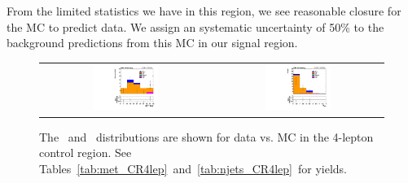 From the limited statistics we have in this region, we see reasonable closure for the MC to predict data.
We assign an systematic uncertainty of 50\% to the background predictions from this MC in our signal region.


\begin{figure}[!h]
\begin{center}
\begin{tabular}{cc}
\includegraphics[width=0.4\textwidth]{bkgd/figs/h_metall_ll_signalregion_CR4lep_passtrig.pdf} &
\includegraphics[width=0.4\textwidth]{bkgd/figs/h_njtall_ll_signalregion_CR4lep_passtrig.pdf} \\
\end{tabular}
\caption{The \MET\ and \nj\ distributions are shown for data vs. MC in the 4-lepton control region.
See Tables~\ref{tab:met_CR4lep}~and~\ref{tab:njets_CR4lep}~for yields.
\label{fig:bkg_CR4lep}
}
\end{center}
\end{figure}





